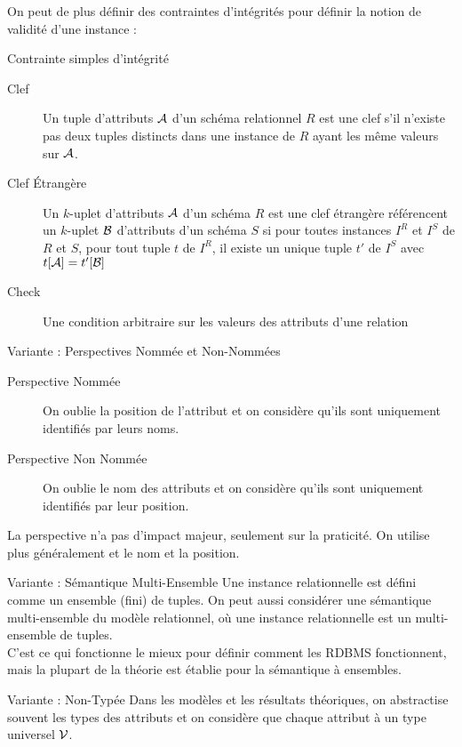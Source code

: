 \documentclass{cours}
\begin{document}
On peut de plus définir des contraintes d'intégrités pour définir la notion de validité d'une instance :
\begin{définition}{Contrainte simples d'intégrité}{}
    \begin{description}
        \item[Clef] Un tuple d'attributs $\mathcal{A}$ d'un schéma relationnel $R$ est une clef s'il n'existe pas deux tuples distincts dans une instance de $R$ ayant les même valeurs sur $\mathcal{A}$. 
        \item[Clef Étrangère] Un $k$-uplet d'attributs $\mathcal{A}$ d'un schéma $R$ est une clef étrangère référencent un $k$-uplet $\mathcal{B}$ d'attributs d'un schéma $S$ si pour toutes instances $I^{R}$ et $I^{S}$ de $R$ et $S$, pour tout tuple $t$ de $I^{R}$, il existe un unique tuple $t'$ de $I^{S}$ avec $t[\mathcal{A}] = t'[\mathcal{B}]$
        \item[Check] Une condition arbitraire sur les valeurs des attributs d'une relation
    \end{description}
\end{définition}

\begin{définition}{Variante : Perspectives Nommée et Non-Nommées}{}
    \begin{description}
        \item[Perspective Nommée] On oublie la position de l'attribut et on considère qu'ils sont uniquement identifiés par leurs noms.
        \item[Perspective Non Nommée] On oublie le nom des attributs et on considère qu'ils sont uniquement identifiés par leur position.  
    \end{description}
    La perspective n'a pas d'impact majeur, seulement sur la praticité. On utilise plus généralement et le nom et la position. 
\end{définition}

\begin{définition}{Variante : Sémantique Multi-Ensemble}{}
    Une instance relationnelle est défini comme un ensemble (fini) de tuples. On peut aussi considérer une sémantique multi-ensemble du modèle relationnel, où une instance relationnelle est un multi-ensemble de tuples. \\
    C'est ce qui fonctionne le mieux pour définir comment les RDBMS fonctionnent, mais la plupart de la théorie est établie pour la sémantique à ensembles. 
\end{définition}

\begin{définition}{Variante : Non-Typée}{}
    Dans les modèles et les résultats théoriques, on abstractise souvent les types des attributs et on considère que chaque attribut à un type universel $\mathcal{V}$. 
\end{définition}
\end{document}
